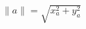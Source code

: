 \documentclass[preview]{standalone}
\begin{document}
\begin{align*}
\| a \| = \sqrt{x_a^2 + y_a^2}
\end{align*}
\end{document}
